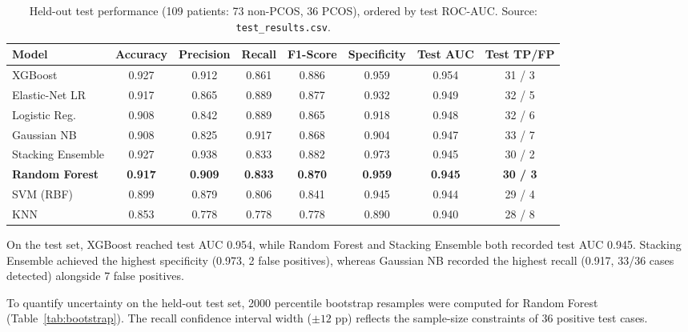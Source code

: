 \documentclass[10pt,twocolumn,a4paper]{article}
\begin{document}
\begin{table}[t]
\centering
\caption{Held-out test performance (109 patients: 73 non-PCOS, 36 PCOS), ordered by test ROC-AUC. Source: \texttt{test\_results.csv}.}
\label{tab:test_results}
\setlength{\tabcolsep}{6pt}
\small
\begin{tabular}{@{}l c c c c c c c@{}}
\toprule
Model & Accuracy & Precision & Recall & F1-Score & Specificity & Test AUC & Test TP/FP \\
\midrule
XGBoost            & 0.927 & 0.912 & 0.861 & 0.886 & 0.959 & 0.954 & 31 / 3 \\
Elastic-Net LR     & 0.917 & 0.865 & 0.889 & 0.877 & 0.932 & 0.949 & 32 / 5 \\
Logistic Reg.      & 0.908 & 0.842 & 0.889 & 0.865 & 0.918 & 0.948 & 32 / 6 \\
Gaussian NB        & 0.908 & 0.825 & 0.917 & 0.868 & 0.904 & 0.947 & 33 / 7 \\
Stacking Ensemble  & 0.927 & 0.938 & 0.833 & 0.882 & 0.973 & 0.945 & 30 / 2 \\
\textbf{Random Forest} & \textbf{0.917} & \textbf{0.909} & \textbf{0.833} & \textbf{0.870} & \textbf{0.959} & \textbf{0.945} & \textbf{30 / 3} \\
SVM (RBF)          & 0.899 & 0.879 & 0.806 & 0.841 & 0.945 & 0.944 & 29 / 4 \\
KNN                & 0.853 & 0.778 & 0.778 & 0.778 & 0.890 & 0.940 & 28 / 8 \\
\bottomrule
\end{tabular}
\end{table}

On the test set, XGBoost reached test AUC 0.954, while Random Forest and Stacking Ensemble both recorded test AUC 0.945.
Stacking Ensemble achieved the highest specificity (0.973, 2 false positives), whereas Gaussian NB recorded the highest recall
(0.917, 33/36 cases detected) alongside 7 false positives.

To quantify uncertainty on the held-out test set, 2000 percentile bootstrap resamples were computed for Random Forest (Table~\ref{tab:bootstrap}).
The recall confidence interval width ($\pm 12$ pp) reflects the sample-size constraints of 36 positive test cases.
\end{document}
